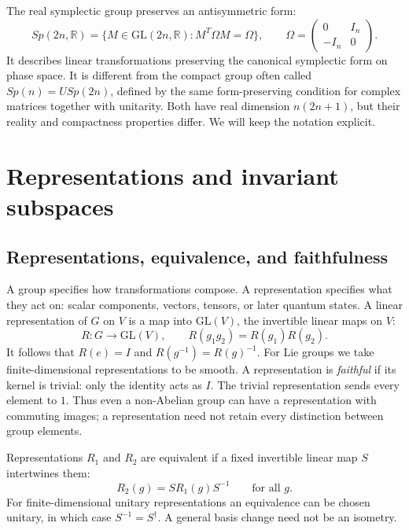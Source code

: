 \documentclass[11pt]{article}
\newcommand{\R}{\mathbb{R}}
\newcommand{\GL}{\mathrm{GL}}
\begin{document}
The real symplectic group preserves an antisymmetric form:
\begin{equation}
Sp(2n,\R)=\{M\in\GL(2n,\R):M^T\Omega M=\Omega\},\qquad
\Omega=\begin{pmatrix}0&I_n\\-I_n&0\end{pmatrix}.
\label{eq:symplecticGroup}
\end{equation}
It describes linear transformations preserving the canonical symplectic
form on phase space. It is different from the compact group often called
\(Sp(n)=USp(2n)\), defined by the same form-preserving condition for
complex matrices together with unitarity. Both have real dimension
\(n(2n+1)\), but their reality and compactness properties differ.
We will keep the notation explicit.

\section{Representations and invariant subspaces}

\subsection{Representations, equivalence, and faithfulness}
A group specifies how transformations compose. A representation specifies
what they act on: scalar components, vectors, tensors, or later quantum
states. A linear representation of \(G\) on \(V\) is a map into
\(\GL(V)\), the invertible linear maps on \(V\):
\begin{equation}
R:G\longrightarrow\GL(V),\qquad
\boxed{R(g_1g_2)=R(g_1)R(g_2).}
\label{eq:repDefinition}
\end{equation}
It follows that \(R(e)=I\) and \(R(g^{-1})=R(g)^{-1}\).
For Lie groups we take finite-dimensional representations to be smooth.
A representation is \emph{faithful} if its kernel is trivial: only the
identity acts as \(I\). The trivial representation sends every element
to \(1\). Thus even a non-Abelian group can have a representation with
commuting images; a representation need not retain every distinction
between group elements.

Representations \(R_1\) and \(R_2\) are equivalent if a fixed invertible
linear map \(S\) intertwines them:
\begin{equation}
R_2(g)=S R_1(g)S^{-1}\qquad\text{for all }g.
\label{eq:equivalence}
\end{equation}
For finite-dimensional unitary representations an equivalence can be
chosen unitary, in which case \(S^{-1}=S^\dagger\). A general basis
change need not be an isometry.
\end{document}
